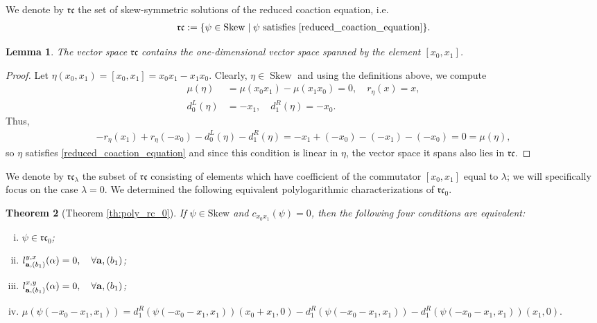 \documentclass[a4paper,fleqn]{cas-sc}
\newtheorem{theorem}{Theorem}
\newtheorem{lemma}[theorem]{Lemma}
\newcommand{\rc}{\mathfrak{rc}}
\DeclareMathOperator{\sk}{Skew}
\begin{document}
We denote by $\mathfrak{rc}$ the set of skew-symmetric solutions of the reduced coaction equation, i.e.
\begin{align*}
    \mathfrak{rc}:=\{\psi\in \mathrm{Skew}\mid \text{$\psi$ satisfies \eqref{reduced_coaction_equation}}\}.
\end{align*}

\renewcommand{\thetheorem}{\arabic{theorem}}
\setcounter{theorem}{1}
\begin{lemma}
The vector space $\mathfrak{rc}$ contains the one-dimensional vector space spanned by the element $[x_0,x_1]$.
\end{lemma} 
\begin{proof}
Let $\eta(x_0,x_1) = [x_0,x_1] = x_0x_1 - x_1x_0$. Clearly, $\eta \in \sk$ and using the definitions above, we compute
\begin{align*}
    \mu(\eta) & = \mu(x_0x_1)-\mu(x_1x_0)=0, \quad  r_\eta(x) =x, \\
    d_0^L(\eta) & = -x_1, \quad d_1^R(\eta) = -x_0.
\end{align*}
Thus, 
\begin{align*}
    -r_{\eta}(x_1)+r_{\eta}(-x_0)-d_0^L(\eta)-d_1^R(\eta) = -x_1 + (-x_0) - (-x_1) - (-x_0) = 0 = \mu(\eta),
\end{align*}
so $\eta$ satisfies \eqref{reduced_coaction_equation} and since this condition is linear in $\eta$, the vector space it spans also lies in $\rc$.
\end{proof}

We denote by $\mathfrak{rc}_\lambda$ the subset of $\mathfrak{rc}$ consisting of elements which have coefficient of the commutator $[x_0,x_1]$ equal to $\lambda$;  %
we will specifically focus on the case $\lambda=0$. 
We determined the following equivalent polylogarithmic characterizations of $\rc_0$.

\renewcommand{\thetheorem}{\Alph{theorem}}
\setcounter{theorem}{1}
\begin{theorem}[Theorem \ref{th:poly_rc_0}] \label{th:poly_rc_0-C}
If $\psi\in \mathrm{Skew}$ and $c_{x_0x_1}(\psi)=0$, then the following four conditions are equivalent:

    \begin{enumerate}[(i)]
        \item %
        $\psi\in \mathfrak{rc}_0$;
        \item %
        $l^{y,x}_{{\bf{a}},(b_1)}(\alpha)=0, \quad \forall {\bf{a}},(b_1)$;
        \item %
        $l_{{\bf{a}},(b_1)}^{x,y}(\alpha)=0, \quad  \forall {\bf{a}},(b_1)$;
        \item \label{thm:rco-equiv-4}
        $\mu(\psi(-x_0-x_1,x_1))=  d^R_1(\psi(-x_0-x_1,x_1))(x_0+x_1,0) - d ^R_{1}(\psi(-x_0-x_1,x_1))-d^R_1(\psi(-x_0-x_1,x_1))(x_1,0).$  
    \end{enumerate}
\end{theorem}
\end{document}
